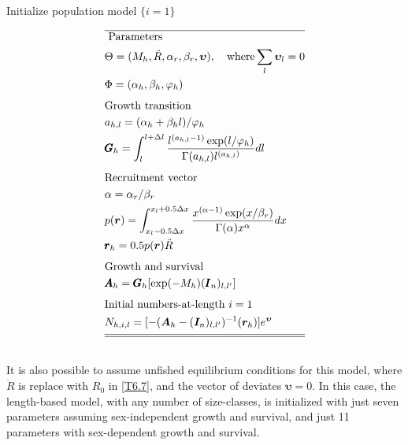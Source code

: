 \documentclass[12pt,letterpaper]{article}
\newcounter{saveEq}
\def\putEq{\setcounter{saveEq}{\value{equation}}}
\def\getEq{\setcounter{equation}{\value{saveEq}}}
\def\tableEq{ %
    \putEq \setcounter{equation}{0}
    \renewcommand{\theequation}{T\arabic{table}.\arabic{equation}}
    \vspace{-5mm}
    }
\def\normalEq{ %
    \getEq
    \renewcommand{\theequation}{\arabic{section}.\arabic{equation}}}
\begin{document}
      \begin{table}
      \centering
      \caption{ Initialize population model $\{i=1\}$ }
      \label{tab:initial_numbers}
      \tableEq
      \begin{align}
        \hline \nonumber
        &\mbox{ Parameters } \\
        &\Theta = (M_h,\ddot{R},\alpha_r,\beta_r, \bm{\upsilon})
        ,\quad\mbox{where} \sum_l \bm{\upsilon}_l = 0 \label{T6.1} \\
        &\Phi = (\alpha_h,\beta_h,\varphi_h)\\[1ex]
        &\mbox{Growth transition}\nonumber \\
        &a_{h,l} = (\alpha_h + \beta_h l)/\varphi_h \label{T6.3} \\
        &\pmb{G}_h= \int_{l}^{l+\Delta l}
        \frac{ l^{(a_{h,l}-1)} \exp(l/\varphi_h) }
        { \Gamma(a_{h,l}) l^{(a_{h,l})} } dl \label{T6.4} \\[1ex]
        &\mbox{Recruitment vector} \nonumber \\
        & \alpha = \alpha_r / \beta_r \label{T6.5} \\
        &p(\boldsymbol{r}) = \int_{x_l-0.5\Delta x}^{x_l+0.5\Delta x}
        \frac{x^{(\alpha-1)}\exp(x / \beta_r)}{\Gamma(\alpha)x^\alpha}dx
        \label{T6.6}\\
        &\pmb{r}_h = 0.5 p(\boldsymbol{r}) \ddot{R} \label{T6.7}\\[1ex]
         &\mbox{Growth and survival} \nonumber \\
        &\pmb{A}_h = \pmb{G}_h [\exp(-M_h) (\pmb{I}_n)_{l,l'}]\label{T6.8}\\[1ex]
        &\mbox{Initial numbers-at-length $i=1$} \nonumber \\
        &N_{h,i,l} = [-(\bm{A}_h - (\bm{I}_n)_{l,l'})^{-1} (\bm{r}_h)] e^{\bm{\upsilon}} \label{T6.9}\\[1ex]
        \hline \hline \nonumber
      \end{align}
      \normalEq
      \end{table}

      It is also possible to assume unfished equilibrium conditions for this model, where $\ddot{R}$ is replace with $R_0$ in \eqref{T6.7}, and the vector of deviates $\bm{\upsilon} = 0$.  In this case, the length-based model, with any number of size-classes, is initialized with just seven parameters assuming sex-independent growth and survival, and just 11 parameters with sex-dependent growth and survival.





%
%


  
  
\end{document}

